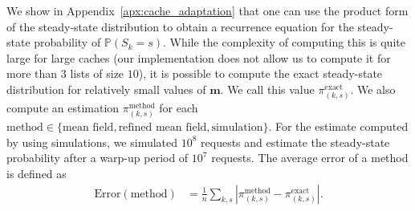 \documentclass[acmsmall]{acmart}
\newcommand\bm{\mathbf{m}}
\newcommand\Proba[1]{\mathbb{P}\left(#1\right)} %
\newcommand\abs[1]{\left|#1\right|}         %
\begin{document}
We show in Appendix~\ref{apx:cache_adaptation} that one can use the product form of the steady-state distribution to obtain a recurrence equation for the steady-state probability of $\Proba{S_k=s}$. While the complexity of computing this is quite large for large caches (our implementation does not allow us to compute it for more than $3$ lists of size $10$), it is possible to compute the exact steady-state distribution for relatively small values of $\bm$. We call this value $\pi_{(k,s)}^{\mathrm{exact}}$. We also compute an estimation $\pi_{(k,s)}^{\text{method}}$ for each $\text{method}\in\{\text{mean field}, \text{refined mean field}, \text{simulation}\}$. For the estimate computed by using simulations, we simulated $10^{8}$ requests and estimate the steady-state probability after a warp-up period of $10^7$ requests. The average error of a method is defined as
\begin{align}
  \label{eq:cache_error}
  \mathrm{Error}(\text{method}) &= \frac1{n}\sum_{k,s} \abs{\pi_{(k,s)}^{\text{method}} - \pi_{(k,s)}^{\text{exact}}}.
\end{align}
\end{document}
